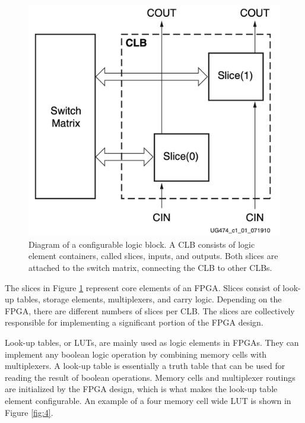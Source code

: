\documentclass[12pt]{report}
\begin{document}
\begin{figure}[h]
    \centering
    \includegraphics[scale=0.25]{figures/clb.png}
    \caption{Diagram of a configurable logic block. A CLB consists of logic element containers, called slices, inputs, and outputs. Both slices are attached to the switch matrix, connecting the CLB to other CLBs. \citep{XilClbMan}}
    \label{fig:3}
\end{figure}

The slices in Figure \ref{fig:3} represent core elements of an FPGA. Slices consist of look-up tables, storage elements, multiplexers, and carry logic. Depending on the FPGA, there are different numbers of slices per CLB. The slices are collectively responsible for implementing a significant portion of the FPGA design. \citep{XilClbMan}
\par
Look-up tables, or LUTs, are mainly used as logic elements in FPGAs. They can implement any boolean logic operation by combining memory cells with multiplexers. A look-up table is essentially a truth table that can be used for reading the result of boolean operations. Memory cells and multiplexer routings are initialized by the FPGA design, which is what makes the look-up table element configurable. An example of a four memory cell wide LUT is shown in Figure \ref{fig:4}. \citep{XilFPGAIntro}
\end{document}
